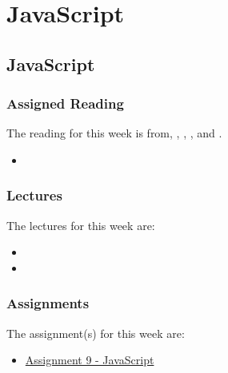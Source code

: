 \clearpage

\renewcommand{\ChapTitle}{JavaScript}
\renewcommand{\SectionTitle}{JavaScript}

\chapter{\ChapTitle}

\section{\SectionTitle}

\subsection{Assigned Reading}

The reading for this week is from, \AgileBook, \EngSoftBook, \ProGitBook, and \LinuxBook.

\begin{itemize}
    \item {}
\end{itemize}

\subsection{Lectures}

The lectures for this week are:

\begin{itemize}
    \item {}
    \item {}
\end{itemize}

\subsection{Assignments}

The assignment(s) for this week are:

\begin{itemize}
    \item \href{https://github.com/cu-cspb-3308-software-dev-summer-2024/lab-9-QuantumCompiler}{Assignment 9 - JavaScript}
\end{itemize}

